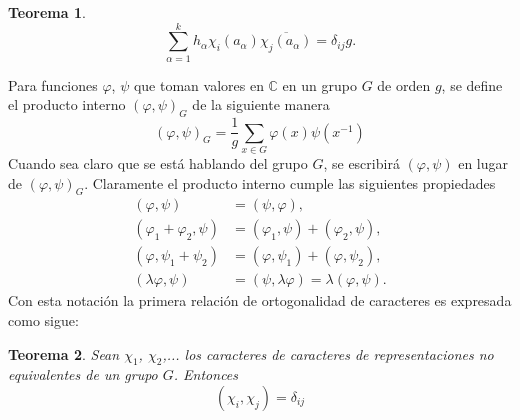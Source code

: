 \documentclass[12pt]{book}
\newtheorem{theorem}{Teorema}[section]
\theoremstyle{definition}
\newcounter{in}
\begin{document}
\begin{theorem}
  \label{t4_4p}
  \begin{equation}
    \label{eq:32}
    \sum_{\alpha=1}^{k} h_{\alpha} \chi_{i}(a_{\alpha}) \overline{\chi_{j}(a_{\alpha})} = \delta_{ij}g.
  \end{equation}
\end{theorem}
Para funciones $\varphi$, $\psi$ que toman valores en $\mathbb{C}$ en
un grupo $G$ de orden $g$, se define el producto interno
$(\varphi,\psi)_{G}$ de la siguiente manera
\begin{equation*}
(\varphi,\psi)_{G} = \frac{1}{g} \sum_{x \in G} \varphi(x) \psi(x^{-1})
\end{equation*}
Cuando sea claro que se está hablando del grupo $G$, se escribirá
$(\varphi,\psi)$ en lugar de $(\varphi,\psi)_{G}$. Claramente el
producto interno cumple las siguientes propiedades
\begin{equation}
  \label{eq:33}
    \begin{aligned}
    (\varphi,\psi) &= (\psi,\varphi), \\
    (\varphi_{1}+\varphi_{2},\psi) &= (\varphi_{1},\psi)+(\varphi_{2},\psi), \\
    (\varphi,\psi_{1}+\psi_{2}) &= (\varphi,\psi_{1})+(\varphi,\psi_{2}), \\
    (\lambda \varphi,\psi) &= (\psi,\lambda \varphi)=\lambda (\varphi,\psi).
  \end{aligned}
\end{equation}
Con esta notación la primera relación de ortogonalidad de caracteres
es expresada como sigue:

\begin{theorem}
  \label{t4_4pp}
  Sean $\chi_{1}$, $\chi_{2}$,... los caracteres de caracteres de
  representaciones no equivalentes de un grupo $G$. Entonces
  \begin{equation*}
    (\chi_{i},\chi_{j})=\delta_{ij}
  \end{equation*} 
\end{theorem}
\end{document}
